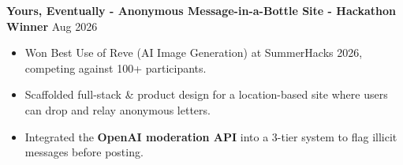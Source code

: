 \documentclass[10pt,letterpaper]{article}
\begin{document}
\textbf{Yours, Eventually - Anonymous Message-in-a-Bottle Site - Hackathon Winner} \hfill Aug 2026 \\
\begin{itemize}
    \item Won Best Use of Reve (AI Image Generation) at SummerHacks 2026, competing against 100+ participants.
    \item Scaffolded full-stack \& product design for a location-based site where users can drop and relay anonymous letters.
    \item Integrated the \textbf{OpenAI moderation API} into a 3-tier system to flag illicit messages before posting.
\end{itemize}



\end{document}
